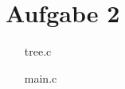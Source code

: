 \documentclass[12pt,a4paper,oneside,ngerman]{article}
\begin{document}
\section*{Aufgabe 2}
\begin{enumerate}
	\item[tree.c]
	
	
	\item[main.c]
	
\end{enumerate}
\end{document}
